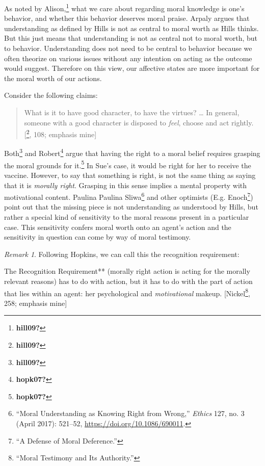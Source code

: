 \documentclass[
  12pt,
]{book}
\theoremstyle{definition}
\theoremstyle{definition}
\theoremstyle{definition}
\theoremstyle{definition}
\theoremstyle{remark}
\newtheorem*{remark}{Remark}
\begin{document}
As noted by Alison,\footnote{\textbf{hill09?}} what we care about regarding moral knowledge is one's behavior, and whether this behavior deserves moral praise. Arpaly argues that understanding as defined by Hills is not as central to moral worth as Hills thinks. But this just means that understanding is not as central not to moral worth, but to behavior. Understanding does not need to be central to behavior because we often theorize on various issues without any intention on acting as the outcome would suggest. Therefore on this view, our affective states are more important for the moral worth of our actions.

\noindent Consider the following claims:

\begin{quote}
What is it to have good character, to have the virtues? \ldots{} In general, someone with a good character is disposed to \emph{feel}, choose and act rightly. {[}\footnote{\textbf{hill09?}}, 108; emphasis mine{]}
\end{quote}

Both\footnote{\textbf{hill09?}} and Robert\footnote{\textbf{hopk07?}} argue that having the right to a moral belief requires grasping the moral grounds for it.\footnote{\textbf{hopk07?}} In Sue's case, it would be right for her to receive the vaccine. However, to say that something is right, is not the same thing as saying that it is \emph{morally right}. Grasping in this sense implies a mental property with motivational content. Paulina Paulina Sliwa\footnote{{``Moral {Understanding} as {Knowing Right} from {Wrong},''} \emph{Ethics} 127, no. 3 (April 2017): 521--52, \url{https://doi.org/10.1086/690011}.} and other optimists (E.g. Enoch\footnote{{``A {Defense} of {Moral Deference}.''}}) point out that the missing piece is not understanding as understood by Hills, but rather a special kind of sensitivity to the moral reasons present in a particular case. This sensitivity confers moral worth onto an agent's action and the sensitivity in question can come by way of moral testimony.

\begin{remark}
Following Hopkins, we can call this the recognition requirement:

The Recognition Requirement** (morally right action is acting for the morally relevant reasons) has to do with action, but it has to do with the part of action that lies within an agent: her psychological and \emph{motivational} makeup. {[}Nickel\footnote{{``Moral {Testimony} and Its {Authority}.''}}, 258; emphasis mine{]}
\end{remark}
\end{document}
